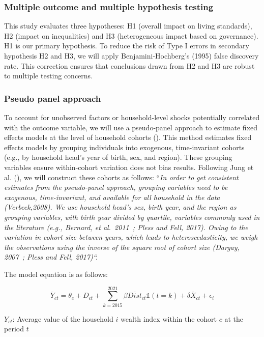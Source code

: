 \documentclass[
]{article}
\begin{document}
\subsubsection{Multiple outcome and multiple hypothesis
testing}\label{multiple-outcome-and-multiple-hypothesis-testing}

This study evaluates three hypotheses: H1 (overall impact on living
standards), H2 (impact on inequalities) and H3 (heterogeneous impact
based on governance). H1 is our primary hypothesis. To reduce the risk
of Type I errors in secondary hypothesis H2 and H3, we will apply
Benjamini-Hochberg's (1995) false discovery rate. This correction
ensures that conclusions drawn from H2 and H3 are robust to multiple
testing concerns.

\subsubsection{Pseudo panel approach}\label{pseudo-panel-approach}

To account for unobserved factors or household-level shocks potentially
correlated with the outcome variable, we will use a pseudo-panel
approach to estimate fixed effects models at the level of household
cohorts (). This method
estimates fixed effects models by grouping individuals into exogenous,
time-invariant cohorts (e.g., by household head's year of birth, sex,
and region). These grouping variables ensure within-cohort variation
does not bias results. Following Jung et al.
(), we will construct these
cohorts as follows: ``\emph{In order to get consistent estimates from
the pseudo-panel approach, grouping variables need to be exogenous,
time-invariant, and available for all household in the data
(Verbeek,2008). We use household head's sex, birth year, and the region
as grouping variables, with birth year divided by quartile, variables
commonly used in the literature (e.g., Bernard, et al.~2011~; Pless and
Fell, 2017). Owing to the variation in cohort size between years, which
leads to heteroscedasticity, we weigh the observations using the inverse
of the square root of cohort size (Dargay, 2007~; Pless and Fell,
2017)``.}

The model equation is as follows:

\[
\overline{Y}_{ct} = \theta_c + D_{ct} + \sum_{k=2015}^{2021} \beta \overline{Dist}_{ct} \mathbb{1}(t = k) + \delta \overline{X}_{ct} + \epsilon_i
\]

\({{Y}_{c t}}\): Average value of the household \(i\) wealth index
within the cohort \(c\) at the period \(t\)
\end{document}
